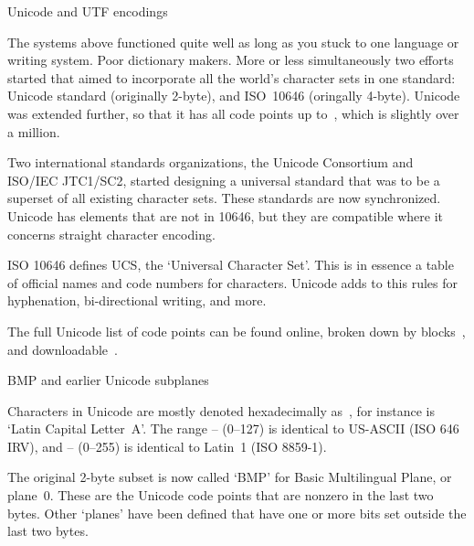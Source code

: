  {Unicode and UTF encodings}
\label{sec:unicode}

The systems above functioned quite well as long as you stuck to one
language or writing system. Poor dictionary makers. More or less
simultaneously two efforts started that aimed to incorporate all the
world's character sets in one standard: Unicode standard (originally 2-byte),
and ISO~10646 (oringally 4-byte). Unicode was
extended further, so that it has all code points up to~, which is
slightly over a million. 


Two international standards organizations,
the Unicode Consortium and ISO/IEC JTC1/SC2,
started designing a universal standard that was to be a
superset of all existing character sets. These standards are now
synchronized. Unicode has elements
that are not in 10646, but they are compatible where it concerns
straight character encoding.

ISO 10646 defines UCS, the `Universal Character Set'. This is in essence a table of official
names
and code numbers for characters. Unicode adds to this rules for hyphenation,
bi-directional writing, and more.

The full Unicode list of code points can be found online, broken down by
blocks~\cite{unicode-fileformat}, and 
downloadable~\cite{unicode-download}.

 {BMP and earlier Unicode subplanes}

Characters in Unicode are mostly denoted hexadecimally as~,
for instance  is `Latin Capital Letter~A'.
The range -- (0--127) is identical to US-ASCII
(ISO 646 IRV), and -- (0--255) is identical to
Latin~1 (ISO 8859-1).

The original 2-byte subset is
now called `BMP' for Basic Multilingual Plane, or
plane~0. These are the Unicode code points that are nonzero in the
last two bytes. Other `planes' have been defined that have one or more
bits set outside the last two bytes.

